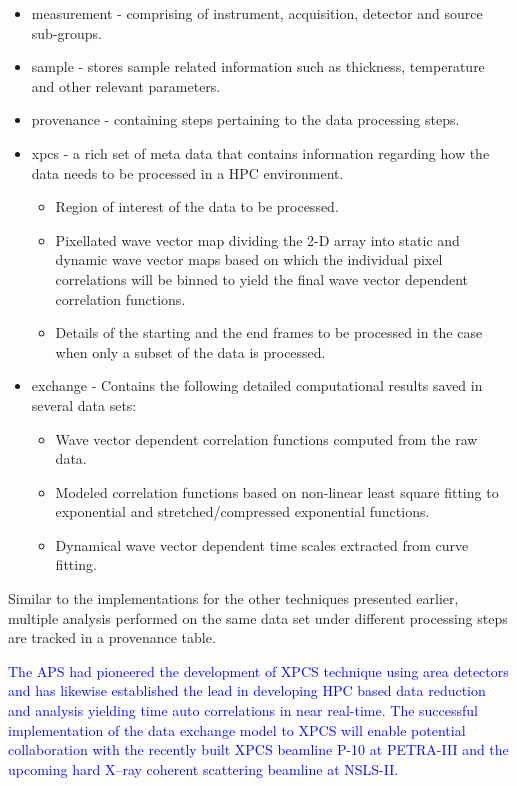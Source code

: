 \documentclass[pdf]{iucr}              %
\begin{document}
\begin{itemize}
\item measurement - comprising of instrument, acquisition, detector and source sub-groups.
\item sample - stores sample related information such as thickness, temperature and other relevant parameters.
\item provenance - containing steps pertaining to the data processing steps.
\item xpcs - a rich set of meta data that contains information regarding how the data needs to be processed in a HPC environment.
	\begin{itemize}
	\item Region of interest of the data to be processed.
	\item Pixellated wave vector map dividing the 2-D array into static and dynamic wave vector maps based on which the individual pixel correlations will be binned to yield the final wave vector dependent correlation functions.
	\item Details of the starting and the end frames to be processed in the case when only a subset of the data is processed.
	\end{itemize}

\item exchange - Contains the following detailed computational results saved in several data sets:
	\begin{itemize}
		\item Wave vector dependent correlation functions computed from the raw data.
		\item Modeled correlation functions based on non-linear least square fitting to exponential and stretched/compressed exponential functions.
		\item Dynamical wave vector dependent time scales extracted from curve fitting.
	\end{itemize}
\end{itemize}

Similar to the implementations for the other techniques presented earlier, multiple analysis performed on the same data set under different processing steps are tracked in a provenance table.

\textcolor{blue}{The APS had pioneered the development of XPCS technique using area detectors and has likewise established the lead in developing HPC based data reduction and analysis yielding time auto correlations in near real-time. The successful implementation of the data exchange model to XPCS will enable potential collaboration with the recently built XPCS beamline P-10 at PETRA-III and the upcoming hard X--ray coherent scattering beamline at NSLS-II. }
\end{document}
